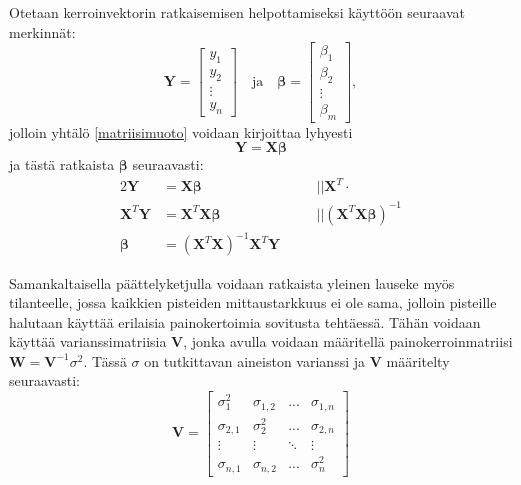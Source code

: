 \documentclass[12pt,a4paper,titlepage]{article}
\newcommand{\matr}[1]{\bm{#1}}
\newcommand{\transpose}[1]{{#1}^T}
\begin{document}
Otetaan kerroinvektorin ratkaisemisen helpottamiseksi käyttöön seuraavat merkinnät:
\begin{equation*}
	\matr{Y} =
		\begin{bmatrix}
			y_1 \\
			y_2 \\
			\vdots \\
			y_n
		\end{bmatrix} \quad \text{ja} \quad
	\matr{\beta} =
		\begin{bmatrix}
			\beta_1 \\
			\beta_2 \\
			\vdots \\
			\beta_m			
		\end{bmatrix},
\end{equation*}
jolloin yhtälö \ref{matriisimuoto} voidaan kirjoittaa lyhyesti
\begin{equation}
	\matr{Y} = \matr{X}\matr{\beta}
\end{equation}
ja tästä ratkaista $\matr{\beta}$ seuraavasti:
\begin{alignat}{2} \label{ilmanvirhetta}
	\matr{Y} &= \matr{X}\matr{\beta} &&|| \transpose{\matr{X}} \cdot \nonumber \\
	\transpose{\matr{X}}\matr{Y} &= \transpose{\matr{X}}\matr{X}\matr{\beta} &&|| (\transpose{\matr{X}}\matr{X}\matr{\beta})^{-1} \nonumber \\
	\matr{\beta} &= (\transpose{\matr{X}}\matr{X})^{-1}\transpose{\matr{X}}\matr{Y} \quad &&
\end{alignat}

Samankaltaisella päättelyketjulla voidaan ratkaista yleinen lauseke myös tilanteelle, jossa kaikkien pisteiden mittaustarkkuus ei ole sama, jolloin pisteille halutaan käyttää erilaisia painokertoimia sovitusta tehtäessä. Tähän voidaan käyttää varianssimatriisia $\matr{V}$, jonka avulla voidaan määritellä painokerroinmatriisi $\matr{W}=\matr{V}^{-1}\sigma^2$. Tässä $\sigma$ on tutkittavan aineiston varianssi ja $\matr{V}$ määritelty seuraavasti:~\cite{basicideas}
\begin{equation*}
	\matr{V}
	=
	\begin{bmatrix}
		\sigma_1^2   & \sigma_{1,2} &   ...  & \sigma_{1,n} \\
		\sigma_{2,1} & \sigma_2^2   &   ...  & \sigma_{2,n} \\
		\vdots       & \vdots       & \ddots & \vdots \\
		\sigma_{n,1}  & \sigma_{n,2}  &   ...  & \sigma_n^2
	\end{bmatrix}
\end{equation*}
\end{document}
